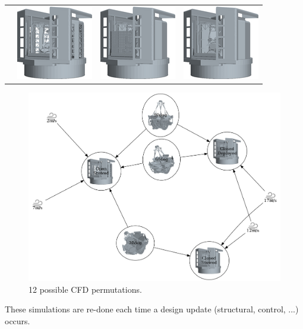 \documentclass[]{AO4ELT}  %
\begin{document}
\begin{itemize}
\begin{tabular}{cccc}
                                                                          & \includegraphics[width=0.2\linewidth]{zen30az000_OS7_tr.png} &
            \includegraphics[width=0.2\linewidth]{zen30az000_CD12_tr.png} &
            \includegraphics[width=0.2\linewidth]{zen60az000_CS17_tr.png}
         \end{tabular}
\end{itemize}

\begin{figure}
   \centering
   \includegraphics[width=\linewidth]{cfd_cases_tr.dot.png}
   \caption{12 possible CFD permutations.}
   \label{fig:17}
\end{figure}

These simulations are re-done each time a design update (structural, control, ...) occurs.
\end{document}
